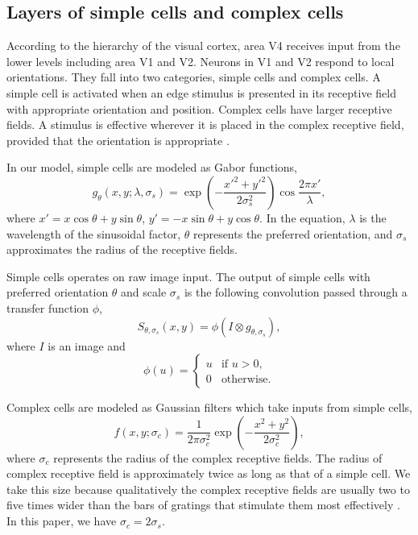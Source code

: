 \documentclass[twocolumn]{article}
\begin{document}
\subsection{Layers of simple cells and complex cells}

According to the hierarchy of the visual cortex, area V4 receives input from the lower levels including area V1 and V2.
Neurons in V1 and V2 respond to local orientations.
They fall into two categories, simple cells and complex cells.
A simple cell is activated when an edge stimulus is presented in its receptive field with appropriate orientation and position.
Complex cells have larger receptive fields.
A stimulus is effective wherever it is placed in the complex receptive field, provided that the orientation is appropriate \cite{hubel1962}.

In our model, simple cells are modeled as Gabor functions,
\begin{equation}\label{equ:gabor}
g_{\theta}(x,y;\lambda,\sigma_s)
=\exp \left(-\frac{x'^2+y'^2}{2\sigma_s^2}\right)
\cos\frac{2\pi x'}{\lambda},
\end{equation}
where $x'=x\cos\theta+y\sin\theta$, $y'=-x\sin\theta+y\cos\theta$.
In the equation, $\lambda$ is the wavelength of the sinusoidal factor, 
$\theta$ represents the preferred orientation,
and $\sigma_s$ approximates the radius of the receptive fields.

Simple cells operates on raw image input. 
The output of simple cells with preferred orientation $\theta$ and scale $\sigma_s$ is the following convolution passed through a transfer function $\phi$,
\begin{equation}\label{equ:gabor}
S_{\theta,\sigma_s}(x,y)=\phi(I\otimes g_{\theta,\sigma_s}),
\end{equation}
where $I$ is an image and 
\begin{equation}\label{equ:gabor}
\phi(u)=\left\{\begin{array}{ll}
u & \text{if } u>0,\\
0 & \text{otherwise.}
\end{array}\right.
\end{equation}

Complex cells are modeled as Gaussian filters which take inputs from simple cells,
\begin{equation}
f(x,y;\sigma_c)=\frac{1}{2\pi\sigma_c^2}\exp\left(-\frac{x^2+y^2}{2\sigma_c^2}\right),
\end{equation}
where $\sigma_c$ represents the radius of the complex receptive fields.
The radius of complex receptive field is approximately twice as long as that of a simple cell.
We take this size because qualitatively the complex receptive fields are usually two to five times wider 
than the bars of gratings that stimulate them most effectively \cite{hubel1962}.
In this paper, we have $\sigma_c=2\sigma_s$.
\end{document}
